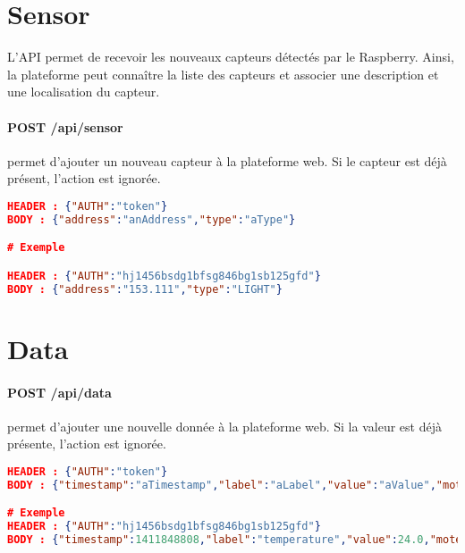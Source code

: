 \section{Sensor}

L'API permet de recevoir les nouveaux capteurs détectés par le Raspberry. Ainsi, la plateforme peut connaître la liste des capteurs et associer une description et une localisation du capteur.

\paragraph{POST /api/sensor} permet d'ajouter un nouveau capteur à la plateforme web. Si le capteur est déjà présent, l'action est ignorée.
\begin{lstlisting}[language=json,emph={token, anAddress, aType},emphstyle={\bfseries\itshape},basicstyle={\ttfamily},caption=POST /api/sensor]
HEADER : {"AUTH":"token"}
BODY : {"address":"anAddress","type":"aType"}

# Exemple

HEADER : {"AUTH":"hj1456bsdg1bfsg846bg1sb125gfd"}
BODY : {"address":"153.111","type":"LIGHT"}
\end{lstlisting}




\section{Data}

\paragraph{POST /api/data} permet d'ajouter une nouvelle donnée à la plateforme web. Si la valeur est déjà présente, l'action est ignorée.
\begin{lstlisting}[language=json,emph={token, aTimestamp, aLabel,aValue,aMote},emphstyle={\bfseries\itshape},basicstyle={\ttfamily},caption=POST /api/data]
HEADER : {"AUTH":"token"}
BODY : {"timestamp":"aTimestamp","label":"aLabel","value":"aValue","mote":"aMote"}

# Exemple
HEADER : {"AUTH":"hj1456bsdg1bfsg846bg1sb125gfd"}
BODY : {"timestamp":1411848808,"label":"temperature","value":24.0,"mote":"219.98"}
\end{lstlisting}